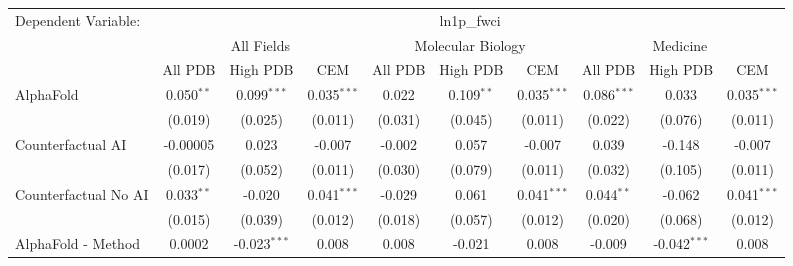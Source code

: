 \begingroup
\centering
\begin{tabular}{lccccccccc}
   \tabularnewline \midrule \midrule
   Dependent Variable: & \multicolumn{9}{c}{ln1p\_fwci}\\
 & \multicolumn{3}{c}{All Fields} & \multicolumn{3}{c}{Molecular Biology} & \multicolumn{3}{c}{Medicine} \\
\cmidrule(lr){2-7} \cmidrule(lr){5-10} \cmidrule(lr){8-7}
 & \multicolumn{1}{c}{All PDB} & \multicolumn{1}{c}{High PDB} & \multicolumn{1}{c}{CEM} & \multicolumn{1}{c}{All PDB} & \multicolumn{1}{c}{High PDB} & \multicolumn{1}{c}{CEM} & \multicolumn{1}{c}{All PDB} & \multicolumn{1}{c}{High PDB} & \multicolumn{1}{c}{CEM} \\
\cmidrule(lr){2-3} \cmidrule(lr){3-4} \cmidrule(lr){4-5} \cmidrule(lr){5-6} \cmidrule(lr){6-7} \cmidrule(lr){7-8} \cmidrule(lr){8-9} \cmidrule(lr){9-10} \cmidrule(lr){10-3}
   AlphaFold                                                   & 0.050$^{**}$  & 0.099$^{***}$  & 0.035$^{***}$ & 0.022         & 0.109$^{**}$  & 0.035$^{***}$ & 0.086$^{***}$ & 0.033          & 0.035$^{***}$\\   
                                                               & (0.019)       & (0.025)        & (0.011)       & (0.031)       & (0.045)       & (0.011)       & (0.022)       & (0.076)        & (0.011)\\   
   Counterfactual AI                                           & -0.00005      & 0.023          & -0.007        & -0.002        & 0.057         & -0.007        & 0.039         & -0.148         & -0.007\\   
                                                               & (0.017)       & (0.052)        & (0.011)       & (0.030)       & (0.079)       & (0.011)       & (0.032)       & (0.105)        & (0.011)\\   
   Counterfactual No AI                                        & 0.033$^{**}$  & -0.020         & 0.041$^{***}$ & -0.029        & 0.061         & 0.041$^{***}$ & 0.044$^{**}$  & -0.062         & 0.041$^{***}$\\   
                                                               & (0.015)       & (0.039)        & (0.012)       & (0.018)       & (0.057)       & (0.012)       & (0.020)       & (0.068)        & (0.012)\\   
   AlphaFold - Method                                          & 0.0002        & -0.023$^{***}$ & 0.008         & 0.008         & -0.021        & 0.008         & -0.009        & -0.042$^{***}$ & 0.008\\   

\end{tabular}
